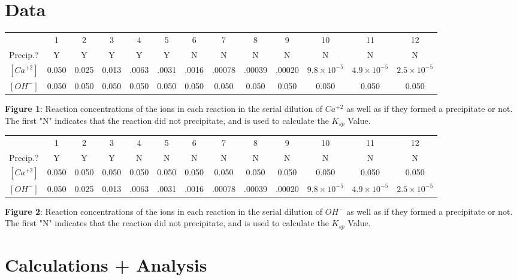 \documentclass{article}
\begin{document}
\section{Data}
\begin{table}[H]
    \begin{tabularx}{400pt}{c|c|c|c|c|c|c|c|c|c|c|c|c} & 1 & 2 & 3 & 4 & 5 & 6 & 7 & 8 & 9 & 10 & 11 & 12  \\
    Precip.? & Y & Y & Y & Y & Y & N & N & N & N & N & N & N  \\
    $[Ca^{+2}]$ & 0.050 & 0.025 & 0.013 & .0063 & .0031 & .0016 & .00078 & .00039 & .00020 & $9.8\times10^{-5}$ & $4.9\times 10^{-5}$ & $2.5\times 10^{-5}$\\
    $[OH^{-}]$ & 0.050 & 0.050 & 0.050 & 0.050 & 0.050 & 0.050 & 0.050 & 0.050 & 0.050 & 0.050 & 0.050 & 0.050 \\
    
    \end{tabularx}
\end{table}
\centering
\textbf{Figure 1}: Reaction concentrations of the ions in each reaction in the serial dilution of $Ca^{+2}$ as well as if they formed a precipitate or not.  The first "N" indicates that the reaction did not precipitate, and is used to calculate the $K_{sp}$ Value.
$\ 
$\begin{table}[H]
    \begin{tabularx}{400pt}{c|c|c|c|c|c|c|c|c|c|c|c|c} & 1 & 2 & 3 & 4 & 5 & 6 & 7 & 8 & 9 & 10 & 11 & 12  \\
    Precip.? & Y & Y & Y & N & N & N & N & N & N & N & N & N  \\
    $[Ca^{+2}]$ & 0.050 & 0.050 & 0.050 & 0.050 & 0.050 & 0.050 & 0.050 & 0.050 & 0.050 & 0.050 & 0.050 & 0.050 \\
    $[OH^{-}]$ & 0.050 & 0.025 & 0.013 & .0063 & .0031 & .0016 & .00078 & .00039 & .00020 & $9.8\times10^{-5}$ & $4.9\times 10^{-5}$ & $2.5\times 10^{-5}$\\
    
    
    \end{tabularx}
\end{table}
\centering
\textbf{Figure 2}: Reaction concentrations of the ions in each reaction in the serial dilution of $OH^{-}$ as well as if they formed a precipitate or not.  The first "N" indicates that the reaction did not precipitate, and is used to calculate the $K_{sp}$ Value.
$\ $
\newpage
\section{Calculations + Analysis}
\end{document}
